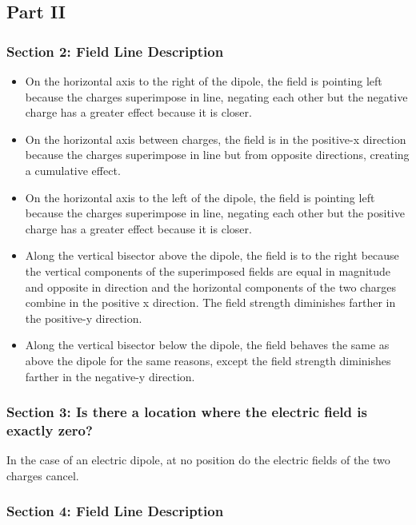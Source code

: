\documentclass{article}
\begin{document}
\subsection{Part II}%
\label{sub:part_2}

\subsubsection{Section 2: Field Line Description}%
\label{ssub:field_line_description}

\begin{itemize}
	\item On the horizontal axis to the right of the dipole, the field is pointing left
		because the charges superimpose in line, negating each other but the negative charge has a greater effect because it is closer.
	\item On the horizontal axis between charges, the field is in the positive-x direction
		because the charges superimpose in line but from opposite directions, creating a cumulative effect.
	\item On the horizontal axis to the left of the dipole, the field is pointing left
		because the charges superimpose in line, negating each other but the positive charge has a greater effect because it is closer.
	\item Along the vertical bisector above the dipole, the field is to the right because the vertical components of the superimposed fields are equal in magnitude
		and opposite in direction and the horizontal components of the two charges combine in the positive x direction.
		The field strength diminishes farther in the positive-y direction.
	\item Along the vertical bisector below the dipole, the field behaves the same as above the dipole for the
		same reasons, except the field strength diminishes farther in the negative-y direction.
\end{itemize}

\subsubsection{Section 3: Is there a location where the electric field is exactly zero?}%
\label{ssub:is_there_a_location_where_the_electric_field_is_exactly_zero_}

In the case of an electric dipole, at no position do the electric fields of the two charges cancel.

\subsubsection{Section 4: Field Line Description}%
\label{ssub:field_line_description}
\end{document}
